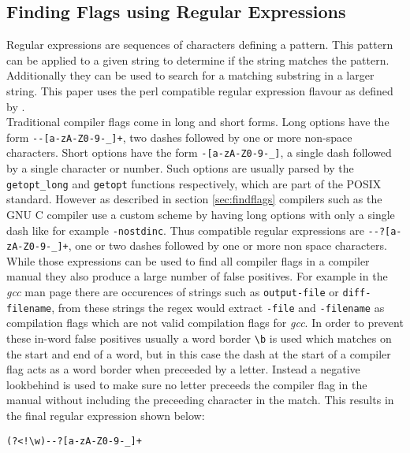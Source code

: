 \documentclass[9pt, a4paper, twocolumn]{article}
\begin{document}
\subsection{Finding Flags using Regular Expressions} \label{sec:findflags:regex}
Regular expressions are sequences of characters defining a pattern. This pattern can be applied to a given string to determine if the string matches the pattern. Additionally they can be used to search for a matching substring in a larger string\cite{regex}. This paper uses the perl compatible regular expression flavour as defined by \cite{pcre}. \\
Traditional compiler flags come in long and short forms. Long options have the form \verb'--[a-zA-Z0-9-_]+', two dashes followed by one or more non-space characters. Short options have the form \verb'-[a-zA-Z0-9-_]', a single dash followed by a single character or number. Such options are usually parsed by the \verb'getopt_long' and \verb'getopt' functions respectively, which are part of the POSIX standard\cite{posix}. However as described in section \ref{sec:findflags} compilers such as the GNU C compiler use a custom scheme by having long options with only a single dash like for example \verb'-nostdinc'. Thus compatible regular expressions are \verb'--?[a-zA-Z0-9-_]+', one or two dashes followed by one or more non space characters.
While those expressions can be used to find all compiler flags in a compiler manual they also produce a large number of false positives. For example in the \textit{gcc} man page there are occurences of strings such as \verb'output-file' or \verb'diff-filename', from these strings the regex would extract \verb'-file' and \verb'-filename' as compilation flags which are not valid compilation flags for \textit{gcc}. In order to prevent these in-word false positives usually a word border \verb'\b' is used which matches on the start and end of a word, but in this case the dash at the start of a compiler flag acts as a word border when preceeded by a letter. Instead a negative lookbehind is used to make sure no letter preceeds the compiler flag in the manual without including the preceeding character in the match. This results in the final regular expression shown below:
\begin{center}
	\verb'(?<!\w)--?[a-zA-Z0-9-_]+'
\end{center}
\end{document}
